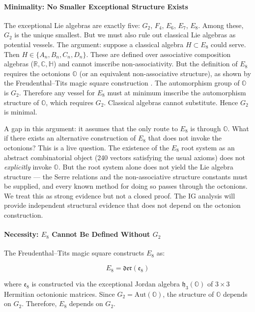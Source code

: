 \documentclass[12pt,a4paper]{article}
\begin{document}
\paragraph{Minimality: No Smaller Exceptional Structure Exists}

The exceptional Lie algebras are exactly five: $G_2$, $F_4$, $E_6$, $E_7$, $E_8$. Among these, $G_2$ is the unique smallest. But we must also rule out classical Lie algebras as potential vessels. The argument: suppose a classical algebra $H \subset E_8$ could serve. Then $H \in \{A_n, B_n, C_n, D_n\}$. These are defined over associative composition algebras ($\mathbb{R}, \mathbb{C}, \mathbb{H}$) and cannot imscribe non-associativity. But the definition of $E_8$ requires the octonions $\mathbb{O}$ (or an equivalent non-associative structure), as shown by the Freudenthal--Tits magic square construction \cite{tits1966,baez2002}. The automorphism group of $\mathbb{O}$ is $G_2$. Therefore any vessel for $E_8$ must at minimum imscribe the automorphism structure of $\mathbb{O}$, which requires $G_2$. Classical algebras cannot substitute. Hence $G_2$ is minimal.

A gap in this argument: it assumes that the only route to $E_8$ is through $\mathbb{O}$. What if there exists an alternative construction of $E_8$ that does not invoke the octonions? This is a live question. The existence of the $E_8$ root system as an abstract combinatorial object (240 vectors satisfying the usual axioms) does not \emph{explicitly} invoke $\mathbb{O}$. But the root system alone does not yield the Lie algebra structure --- the Serre relations and the non-associative structure constants must be supplied, and every known method for doing so passes through the octonions. We treat this as strong evidence but not a closed proof. The IG analysis will provide independent structural evidence that does not depend on the octonion construction.

\paragraph{Necessity: $E_8$ Cannot Be Defined Without $G_2$}

The Freudenthal--Tits magic square \cite{tits1966,baez2002} constructs $E_8$ as:

\[E_8 = \mathfrak{der}(\mathfrak{e}_8)\]

where $\mathfrak{e}_8$ is constructed via the exceptional Jordan algebra $\mathfrak{h}_3(\mathbb{O})$ of $3 \times 3$ Hermitian octonionic matrices. Since $G_2 = \text{Aut}(\mathbb{O})$, the structure of $\mathbb{O}$ depends on $G_2$. Therefore, $E_8$ depends on $G_2$.
\end{document}
